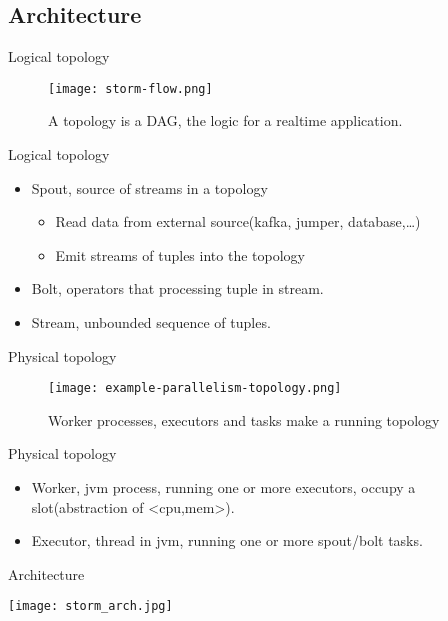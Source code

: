 \documentclass{beamer}
\begin{document}
\subsection{Architecture}
\begin{frame}{Logical topology}
  \begin{figure}
    \centering
    \texttt{[image: storm-flow.png]}
    \caption{A topology is a DAG, the logic for a realtime application.}
  \end{figure}
\end{frame}
\begin{frame}{Logical topology}
  \begin{itemize}
    \item Spout, source of streams in a topology\\
      \begin{itemize}
	\item Read data from external source(kafka, jumper, database,\ldots)
	\item Emit streams of tuples into the topology
      \end{itemize}

    \item Bolt, operators that processing tuple in stream.
    \item Stream, unbounded sequence of tuples.
    
  \end{itemize}
\end{frame}
\begin{frame}{Physical topology}
  \begin{figure}
    \centering
    \texttt{[image: example-parallelism-topology.png]}
    \caption{Worker processes, executors and tasks make a running topology}
  \end{figure}
\end{frame}
\begin{frame}{Physical topology}
  \begin{itemize}
    \item Worker, jvm process, running one or more executors,  occupy a slot(abstraction of <cpu,mem>).
    \item Executor, thread in jvm, running one or more spout/bolt tasks.
  \end{itemize}
\end{frame}
\begin{frame}{Architecture}
  \begin{center}
      \texttt{[image: storm\_arch.jpg]}
  \end{center}
\end{frame}
\end{document}
